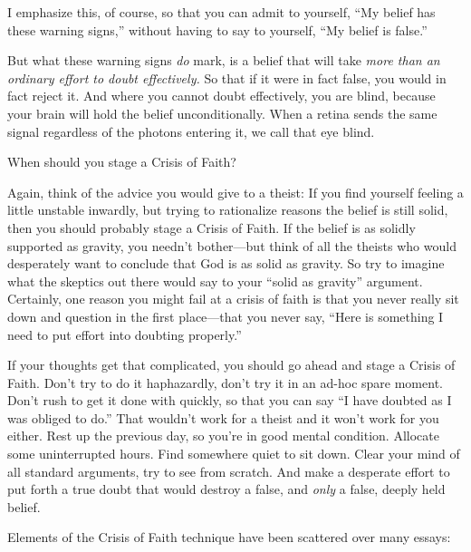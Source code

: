 {
 I emphasize this, of course, so that you can admit to yourself,
``My belief has these warning
signs,'' without having to say to yourself,
``My belief is false.''}

{
 But what these warning signs \textit{do} mark, is a belief that
will take \textit{more than an ordinary effort to doubt effectively.}
So that if it were in fact false, you would in fact reject it. And
where you cannot doubt effectively, you are blind, because your brain
will hold the belief unconditionally. When a retina sends the same
signal regardless of the photons entering it, we call that eye blind.}

{
 When should you stage a Crisis of Faith?}

{
 Again, think of the advice you would give to a theist: If you find
yourself feeling a little unstable inwardly, but trying to rationalize
reasons the belief is still solid, then you should probably stage a
Crisis of Faith. If the belief is as solidly supported as gravity, you
needn't bother---but think of all the theists who would
desperately want to conclude that God is as solid as gravity. So try to
imagine what the skeptics out there would say to your
``solid as gravity'' argument.
Certainly, one reason you might fail at a crisis of faith is that you
never really sit down and question in the first place---that you never
say, ``Here is something I need to put effort into
doubting properly.''}

{
 If your thoughts get that complicated, you should go ahead and
stage a Crisis of Faith. Don't try to do it
haphazardly, don't try it in an ad-hoc spare moment.
Don't rush to get it done with quickly, so that you can
say ``I have doubted as I was obliged to
do.'' That wouldn't work for a theist
and it won't work for you either. Rest up the previous
day, so you're in good mental condition. Allocate some
uninterrupted hours. Find somewhere quiet to sit down. Clear your mind
of all standard arguments, try to see from scratch. And make a
desperate effort to put forth a true doubt that would destroy a false,
and \textit{only} a false, deeply held belief.}

{
 Elements of the Crisis of Faith technique have been scattered over
many essays:}

